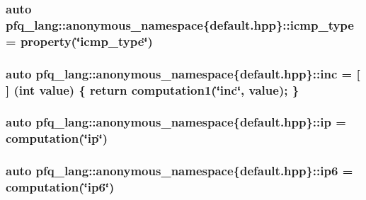 \hypertarget{namespacepfq__lang_1_1anonymous__namespace_02default_8hpp_03_a4adff7ced08caa2d0016a911dae6d2ed}{
\subsubsection[{icmp\-\_\-type}]{\setlength{\rightskip}{0pt plus 5cm}auto pfq\-\_\-lang\-::anonymous\-\_\-namespace\{default.\-hpp\}\-::icmp\-\_\-type = {\bf property}(\char`\"{}icmp\-\_\-type\char`\"{})}}\label{namespacepfq__lang_1_1anonymous__namespace_02default_8hpp_03_a4adff7ced08caa2d0016a911dae6d2ed}
\hypertarget{namespacepfq__lang_1_1anonymous__namespace_02default_8hpp_03_a14246183085ec07f08ab9b0d53907ae5}{
\subsubsection[{inc}]{\setlength{\rightskip}{0pt plus 5cm}auto pfq\-\_\-lang\-::anonymous\-\_\-namespace\{default.\-hpp\}\-::inc = \mbox{[}$\,$\mbox{]} (int value) \{ return {\bf computation1}(\char`\"{}inc\char`\"{}, value); \}}}\label{namespacepfq__lang_1_1anonymous__namespace_02default_8hpp_03_a14246183085ec07f08ab9b0d53907ae5}
\hypertarget{namespacepfq__lang_1_1anonymous__namespace_02default_8hpp_03_a27d30e7744c84a7cdc41a710ee16b885}{
\subsubsection[{ip}]{\setlength{\rightskip}{0pt plus 5cm}auto pfq\-\_\-lang\-::anonymous\-\_\-namespace\{default.\-hpp\}\-::ip = {\bf computation}(\char`\"{}ip\char`\"{})}}\label{namespacepfq__lang_1_1anonymous__namespace_02default_8hpp_03_a27d30e7744c84a7cdc41a710ee16b885}
\hypertarget{namespacepfq__lang_1_1anonymous__namespace_02default_8hpp_03_a566cbe8627dd2ae05071690ef64dbd12}{
\subsubsection[{ip6}]{\setlength{\rightskip}{0pt plus 5cm}auto pfq\-\_\-lang\-::anonymous\-\_\-namespace\{default.\-hpp\}\-::ip6 = {\bf computation}(\char`\"{}ip6\char`\"{})}}\label{namespacepfq__lang_1_1anonymous__namespace_02default_8hpp_03_a566cbe8627dd2ae05071690ef64dbd12}
